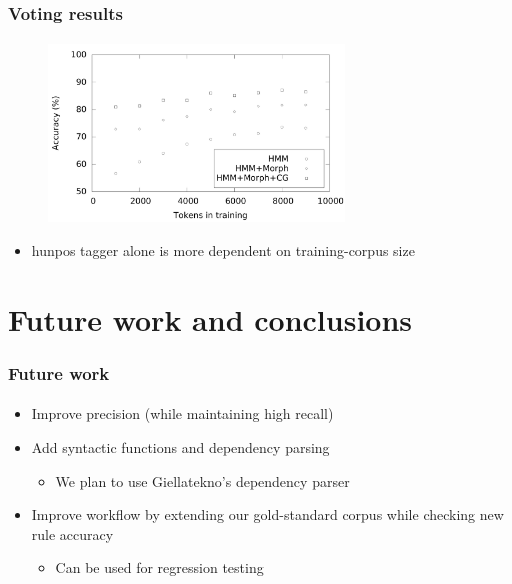 \documentclass{beamer}
\begin{document}
\begin{frame}
\frametitle{Voting results}
\framesubtitle{}
\begin{figure}
  \centering
  \includegraphics[width=0.70\textwidth]{graphics/learning-curve.pdf}
  \label{fig:curve}
\end{figure}
\begin{itemize}
	\item hunpos tagger alone is more dependent on training-corpus size
\end{itemize}
\end{frame}


\section{Future work and conclusions} %

\begin{frame}
\frametitle{Future work}
\framesubtitle{}
\begin{itemize}
	\item Improve precision (while maintaining high recall)
	\pause
	\item Add syntactic functions and dependency parsing
	\begin{itemize}
		\item We plan to use Giellatekno's dependency parser \cite{antonsen10}
		\pause
	\end{itemize}
	\item Improve workflow by extending our gold-standard corpus while checking new rule accuracy
	\begin{itemize}
		\item Can be used for regression testing
	\end{itemize}
\end{itemize}
\end{frame}
\end{document}
